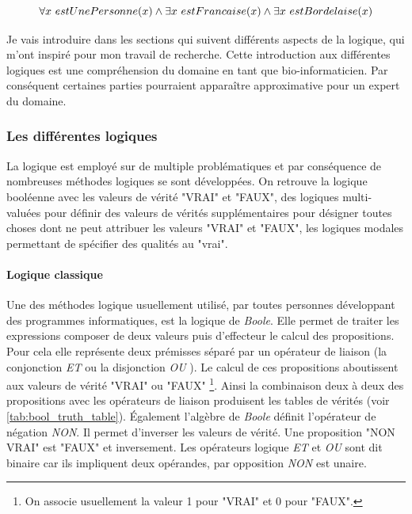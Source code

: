 \begin{refsegment}
    \begin{equation*}
        \forall x~estUnePersonne(x) \land \exists x~estFrancaise(x) \land \exists x~estBordelaise(x) \stepcounter{equation}
    \end{equation*}
    
    Je vais introduire dans les sections qui suivent différents aspects de la logique, qui m'ont inspiré pour mon travail de recherche. Cette introduction aux différentes logiques est une compréhension du domaine en tant que bio-informaticien. Par conséquent certaines parties pourraient apparaître approximative pour un expert du domaine.
    
    \subsubsection{Les différentes logiques}
    
    La logique est employé sur de multiple problématiques et par conséquence de nombreuses méthodes logiques se sont développées. On retrouve la logique booléenne avec les valeurs de vérité "VRAI" et "FAUX", des logiques multi-valuées pour définir des valeurs de vérités supplémentaires pour désigner toutes choses dont ne peut attribuer les valeurs  "VRAI" et "FAUX", les logiques modales permettant de spécifier des qualités au "vrai".
    
    \paragraph{Logique classique}
    
    Une des méthodes logique usuellement utilisé, par toutes personnes développant des programmes informatiques, est la logique de \textit{Boole}. Elle permet de traiter les expressions composer de deux valeurs puis d'effecteur le calcul des propositions. Pour cela elle représente deux prémisses séparé par un opérateur de liaison (la conjonction \textit{ET} ou la disjonction \textit{OU} ). Le calcul de ces propositions aboutissent aux valeurs de vérité "VRAI" ou "FAUX" \footnote{On associe usuellement la valeur 1 pour "VRAI" et 0 pour "FAUX".}. Ainsi la combinaison deux à deux des propositions avec les opérateurs de liaison produisent les tables de vérités (voir \ref{tab:bool_truth_table}). Également l'algèbre de \textit{Boole} définit l'opérateur de négation \textit{NON}. Il permet d'inverser les valeurs de vérité. Une proposition "NON VRAI" est "FAUX" et inversement. Les opérateurs logique \textit{ET} et \textit{OU} sont dit binaire car ils impliquent deux opérandes, par opposition \textit{NON} est unaire.
    

\end{refsegment}
